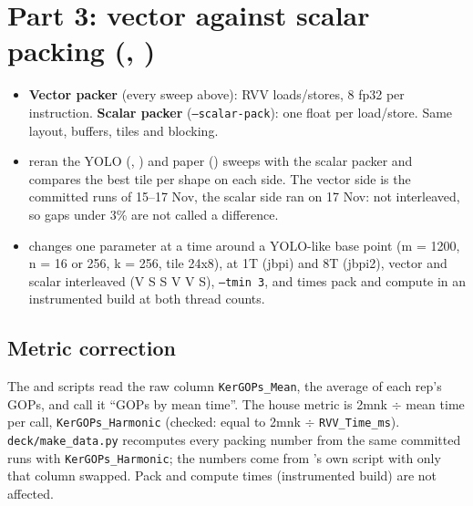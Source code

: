 \section{Part 3: vector against scalar packing (, )}
\begin{itemize}\setlength\itemsep{1pt}
\item \textbf{Vector packer} (every sweep above): RVV loads/stores, 8 fp32 per instruction. \textbf{Scalar packer} (\texttt{--scalar-pack}): one float per load/store. Same layout, buffers, tiles and blocking.
\item \textbf{} reran the YOLO (, ) and paper () sweeps with the scalar packer and compares the best tile per shape on each side. The vector side is the committed runs of 15--17 Nov, the scalar side ran on 17 Nov: not interleaved, so gaps under 3\% are not called a difference.
\item \textbf{} changes one parameter at a time around a YOLO-like base point (m = 1200, n = 16 or 256, k = 256, tile 24x8), at 1T (jbpi) and 8T (jbpi2), vector and scalar interleaved (V S S V V S), \texttt{--tmin 3}, and times pack and compute in an instrumented build at both thread counts.
\end{itemize}

\subsection{Metric correction}\label{sec:metric}
The  and  scripts read the raw column \texttt{KerGOPs\_Mean}, the average of each rep's GOPs, and call it ``GOPs by mean time''. The house metric is 2mnk $\div$ mean time per call, \texttt{KerGOPs\_Harmonic} (checked: equal to 2mnk $\div$ \texttt{RVV\_Time\_ms}). \texttt{deck/make\_data.py} recomputes every packing number from the same committed runs with \texttt{KerGOPs\_Harmonic}; the  numbers come from 's own script with only that column swapped. Pack and compute times (instrumented build) are not affected.

